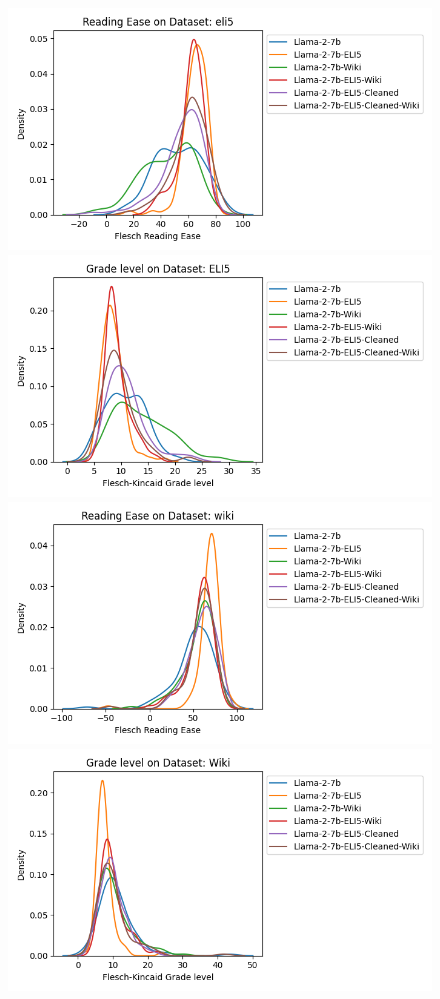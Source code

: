\documentclass[11pt, oneside]{article}   	%
\begin{document}
\begin{figure}
\includegraphics[scale=.5]{./figures/FRE_7B_ELI5.png}
\includegraphics[scale=.5]{./figures/FKG_7B_ELI5.png}
\\
\includegraphics[scale=.5]{./figures/FRE_7B_Wiki.png}
\includegraphics[scale=.5]{./figures/FKG_7B_Wiki.png}

\end{figure}
\end{document}
